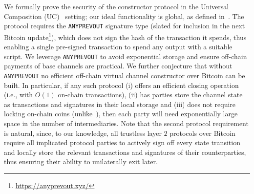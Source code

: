   We formally prove the security of the constructor protocol in the Universal
  Composition (UC)~\cite{uc} setting; our ideal functionality is global,
  as defined in~\cite{DBLP:conf/tcc/BadertscherCHTZ20}. The
  protocol requires the \texttt{ANYPREVOUT} signature type (slated for
  inclusion in the next Bitcoin update\footnote{\url{https://anyprevout.xyz/}}), which does not sign the hash of the
  transaction it spends, thus enabling a single pre-signed transaction
  to spend any output with a suitable script. We leverage \texttt{ANYPREVOUT} to
  avoid exponential storage and ensure off-chain payments of base channels are
  practical. We further conjecture that without
  \texttt{ANYPREVOUT} no efficient off-chain virtual channel constructor
  over Bitcoin can be built. In particular, if any such protocol
  (i) offers an efficient closing operation (i.e., with $O(1)$ on-chain
  transactions), (ii) has parties store the channel state as transactions and
  signatures in their local storage and (iii) does not require locking on-chain
  coins (unlike~\cite{donner}), then each party will need exponentially
  large space in the number of intermediaries. Note that the second protocol
  requirement is natural, since, to our knowledge, all trustless layer $2$
  protocols over Bitcoin require all implicated protocol parties to actively
  sign off every state transition and locally store the relevant transactions
  and signatures of their counterparties, thus ensuring their ability to
  unilaterally exit later.
